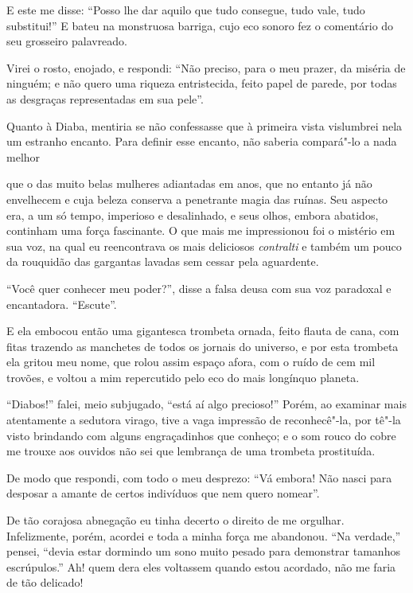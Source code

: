 E este me disse: ``Posso lhe dar aquilo que tudo
consegue, tudo vale, tudo substitui!'' E bateu na
monstruosa barriga, cujo eco sonoro fez o comentário do seu grosseiro
palavreado.

Virei o rosto, enojado, e respondi: ``Não preciso, para o meu
prazer, da miséria de ninguém; e não quero uma riqueza entristecida, feito
papel de parede, por todas as desgraças representadas em sua
pele''.

Quanto à Diaba, mentiria se não confessasse que à primeira vista
vislumbrei nela um estranho encanto. Para definir esse encanto, não
saberia compará"-lo a nada melhor \linebreak

\quebra

\noindent{}que o das muito belas
mulheres adiantadas em anos, que no entanto já não envelhecem e cuja beleza
conserva a penetrante magia das ruínas. Seu aspecto era, a um só tempo,
imperioso e desalinhado, e seus olhos, embora abatidos, continham
uma força fascinante. O que mais me impressionou foi o mistério em sua voz,
na qual eu reencontrava os mais deliciosos \textit{contralti} e
também um pouco da rouquidão das gargantas lavadas sem cessar pela
aguardente.

``Você quer conhecer meu poder?'', disse a
falsa deusa com sua voz paradoxal e encantadora.
“Escute”.

E ela embocou então uma gigantesca trombeta ornada, feito flauta de
cana, com fitas trazendo as manchetes de todos os jornais do universo, e
por esta trombeta ela gritou meu nome, que rolou assim
espaço afora, com o ruído de cem mil trovões, e voltou a mim repercutido pelo
eco do mais longínquo planeta.

``Diabos!'' falei, meio subjugado, ``está aí algo precioso!'' Porém, ao examinar
mais atentamente a sedutora virago, tive a vaga impressão de
reconhecê"-la, por tê"-la visto brindando com alguns engraçadinhos
que conheço; e o som rouco do cobre me trouxe aos ouvidos não
sei que lembrança de uma trombeta prostituída.

De modo que respondi, com todo o meu desprezo: ``Vá embora! Não
nasci para desposar a amante de certos indivíduos que nem quero
nomear''.

De tão corajosa abnegação eu tinha decerto o direito de me orgulhar.
Infelizmente, porém, acordei e toda a minha força me abandonou.
``Na verdade,'' pensei, ``devia estar
dormindo um sono muito pesado para demonstrar tamanhos escrúpulos.'' Ah! quem dera
eles voltassem quando estou acordado, não me faria de tão
delicado!

